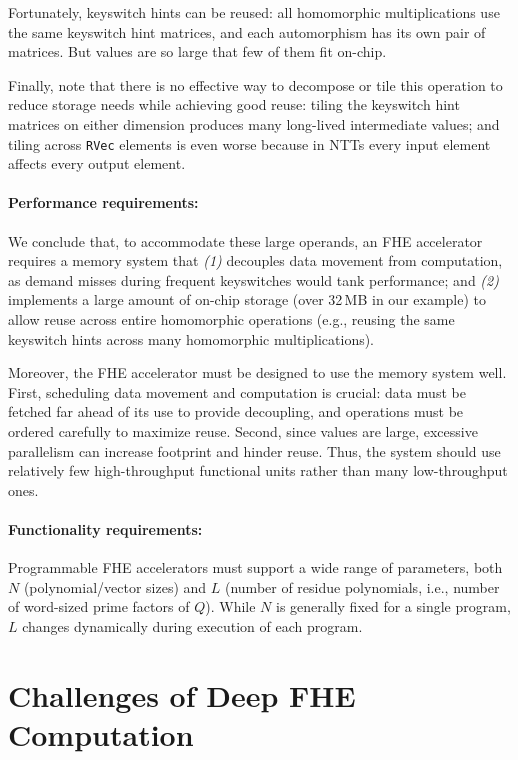 Fortunately, keyswitch hints can be reused: all homomorphic multiplications use
the same keyswitch hint matrices, and each automorphism has its own pair of
matrices. But values are so large that few of them fit on-chip.

Finally, note that there is no effective way to decompose or tile this
operation to reduce storage needs while achieving good reuse: tiling the
keyswitch hint matrices on either dimension produces many long-lived
intermediate values; and tiling across \texttt{RVec} elements is even worse
because in NTTs every input element affects every output element.

\paragraph{Performance requirements:} We conclude that, to accommodate these
large operands, an FHE accelerator requires a memory system that \emph{(1)}
decouples data movement from computation, as demand misses during frequent
keyswitches would tank performance; and \emph{(2)} implements a large amount of
on-chip storage (over 32\,MB in our example) to allow reuse across entire
homomorphic operations (e.g., reusing the same keyswitch hints across many
homomorphic multiplications).

Moreover, the FHE accelerator must be designed to use the memory system well.
First, scheduling data movement and computation is crucial: data must be
fetched far ahead of its use to provide decoupling, and operations must be
ordered carefully to maximize reuse. Second, since values are large, excessive
parallelism can increase footprint and hinder reuse. Thus, the system should
use relatively few high-throughput functional units rather than many
low-throughput ones.

\paragraph{Functionality requirements:}
Programmable FHE accelerators must support a wide range of parameters, both $N$
(polynomial/vector sizes) and $L$ (number of residue polynomials, i.e., number of
word-sized prime factors of $Q$). While $N$ is generally fixed for a single
program, $L$ changes dynamically during execution of each program.

\section{Challenges of Deep FHE Computation}\label{sec:deepChallenges}

